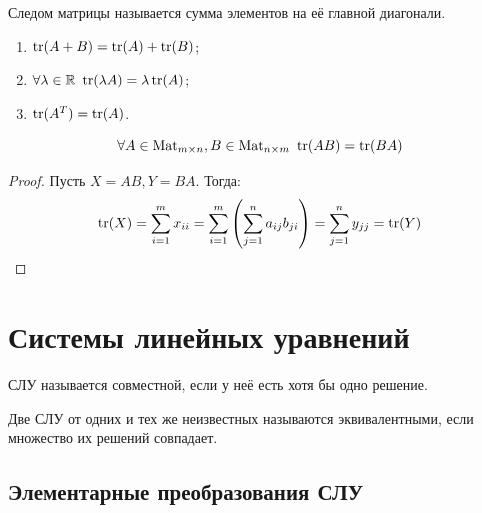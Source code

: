 \documentclass[12pt]{article}
\begin{document}
\begin{definition}
	Следом матрицы называется сумма элементов на её главной диагонали.
\end{definition}
\begin{statement}
	\hfill
	\begin{center}
		\begin{minipage}{0.35\textwidth}
			\begin{enumerate}[itemsep=0pt]
				\item $\operatorname{tr}(A+B)=\operatorname{tr}(A)+\operatorname{tr}(B)$;
				\item $\forall \lambda \in \mathbb{R}\ \operatorname{tr}(\lambda A)=\lambda\operatorname{tr}(A)$;
				\item $\operatorname{tr}(A^T)=\operatorname{tr}(A)$.
			\end{enumerate}
		\end{minipage}
	\end{center}
\end{statement}
\begin{statement}
	\[\forall A\in \operatorname{Mat}_{m \times n}, B \in \operatorname{Mat}_{n \times m}\ \operatorname{tr}(AB)=\operatorname{tr}(BA)\]	
	\begin{proof}
		Пусть $X=AB, Y=BA$. Тогда:
		\[\operatorname{tr}(X)=\sum_{i=1}^{m}x_{ii}=\sum_{i=1}^{m}\left(\sum_{j=1}^{n}a_{ij}b_{ji}\right)=\sum_{j=1}^{n}y_{jj}=\operatorname{tr}(Y)\]	
	\end{proof}
\end{statement}

\section{Системы линейных уравнений}

\begin{definition}
	СЛУ называется совместной, если у неё есть хотя бы одно решение.
\end{definition}
\begin{definition}
	Две СЛУ от одних и тех же неизвестных называются эквивалентными,
	если множество их решений совпадает.
\end{definition}

\subsection{Элементарные преобразования СЛУ}
\end{document}
